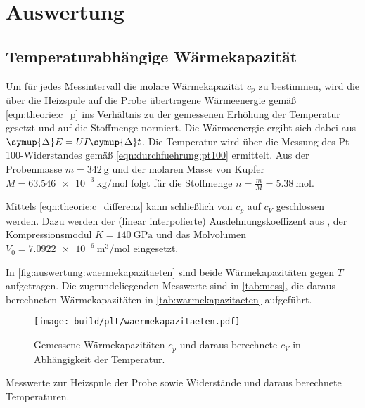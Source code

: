 \section{Auswertung}
\label{sec:auswertung}

\subsection{Temperaturabhängige Wärmekapazität}
Um für jedes Messintervall die molare Wärmekapazität $c_p$ zu bestimmen,
wird die über die Heizspule auf die Probe übertragene Wärmeenergie
gemäß \autoref{eqn:theorie:c_p}
ins Verhältnis zu der gemessenen Erhöhung der Temperatur gesetzt
und auf die Stoffmenge normiert.
Die Wärmeenergie ergibt sich dabei aus $\symup{\Delta}E = U I \symup{\Delta}t$.
Die Temperatur wird über die Messung des Pt-100-Widerstandes gemäß \autoref{eqn:durchfuehrung:pt100} ermittelt.
Aus der Probenmasse $m = \SI{342}{\gram}$ \cite{versuchsanleitung}
und der molaren Masse von Kupfer $M = \SI{63.546e-3}{\kilogram\per\mol}$ \cite{periodictable}
folgt für die Stoffmenge $n = \frac{m}{M} = \SI{5.38}{\mol}$.

Mittels \autoref{eqn:theorie:c_differenz} kann schließlich von $c_p$ auf $c_V$ geschlossen werden.
Dazu werden
der (linear interpolierte) Ausdehnungskoeffizent aus \cite[Tabelle 2]{versuchsanleitung},
der Kompressionsmodul $K = \SI{140}{\giga\pascal}$ \cite{periodictable} und
das Molvolumen $V_0 = \SI{7.0922e-6}{\cubic\meter\per\mol}$ \cite{periodictable} eingesetzt.

In \autoref{fig:auswertung:waermekapazitaeten} sind beide Wärmekapazitäten gegen $T$ aufgetragen.
Die zugrundeliegenden Messwerte sind in \autoref{tab:mess},
die daraus berechneten Wärmekapazitäten in \autoref{tab:warmekapazitaeten} aufgeführt.

\begin{figure}[H]
    \centering
    \texttt{[image: build/plt/waermekapazitaeten.pdf]}
    \caption{Gemessene Wärmekapazitäten $c_p$ und daraus berechnete $c_V$ in Abhängigkeit der Temperatur.}
    \label{fig:auswertung:waermekapazitaeten}
\end{figure}

\begin{table}
    \centering
    \caption{Messwerte zur Heizspule der Probe sowie Widerstände und daraus berechnete Temperaturen.}
    \label{tab:mess}
\end{table}

